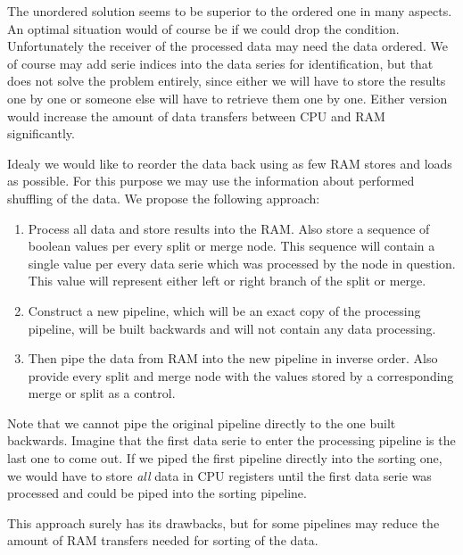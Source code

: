 The unordered solution seems to be superior to the ordered one in many aspects. An optimal situation would of course be if we could drop the condition. Unfortunately the receiver of the processed data may need the data ordered. We of course may add serie indices into the data series for identification, but that does not solve the problem entirely, since either we will have to store the results one by one or someone else will have to retrieve them one by one. Either version would increase the amount of data transfers between CPU and RAM significantly. 

\parspace

Idealy we would like to reorder the data back using as few RAM stores and loads as possible. For this purpose we may use the information about performed shuffling of the data. We propose the following approach:
\begin{enumerate}
  \item Process all data and store results into the RAM. Also store a sequence of boolean values per every split or merge node. This sequence will contain a single value per every data serie which was processed by the node in question. This value will represent either left or right branch of the split or merge.
  \item Construct a new pipeline, which will be an exact copy of the processing pipeline, will be built backwards and will not contain any data processing.
  \item Then pipe the data from RAM into the new pipeline in inverse order. Also provide every split and merge node with the values stored by a corresponding merge or split as a control.
\end{enumerate}

\begin{rem}
  Note that we cannot pipe the original pipeline directly to the one built backwards. Imagine that the first data serie to enter the processing pipeline is the last one to come out. If we piped the first pipeline directly into the sorting one, we would have to store \emph{all} data in CPU registers until the first data serie was processed and could be piped into the sorting pipeline.
\end{rem}

This approach surely has its drawbacks, but for some pipelines may reduce the amount of RAM transfers needed for sorting of the data.
